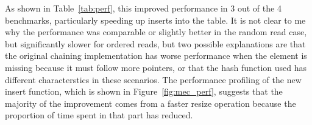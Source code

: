 \documentclass[12pt]{article}
\begin{document}
As shown in Table~\ref{tab:perf}, this improved performance in 3 out of the 4 benchmarks, particularly speeding up 
inserts into the table. It is not clear to me why the performance was comparable or slightly better in the random read 
case, but significantly slower for ordered reads, but two possible explanations are that the original chaining 
implementation has worse performance when the element is missing because it must follow more pointers, or that the hash
function used has different characterstics in these scenarios. The performance profiling of the new insert function, 
which is shown in Figure~\ref{fig:mec_perf},
suggests that the majority of the improvement comes from a faster resize operation because the proportion of time
spent in that part has reduced.
\end{document}
